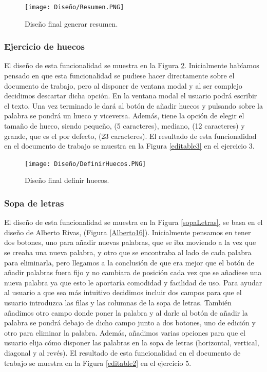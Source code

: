 \begin{figure}[ht!]
  \centering
  \texttt{[image: Diseño/Resumen.PNG]}
  \caption{Diseño final generar resumen.}
  \label{resuemn}
\end{figure}

\subsubsection{Ejercicio de huecos}
El diseño de esta funcionalidad se muestra en la Figura \ref{definir_hueco}. Inicialmente habíamos pensado en que esta funcionalidad se pudiese hacer directamente sobre el documento de trabajo, pero al disponer de ventana modal y al ser complejo decidimos descartar dicha opción. En la ventana modal el usuario podrá escribir el texto. Una vez terminado le dará al botón de añadir huecos y pulsando sobre la palabra se pondrá un hueco y viceversa. Además, tiene la opción de elegir el tamaño de hueco, siendo pequeño, (5 caracteres), mediano, (12 caracteres) y grande, que es el por defecto, (23 caracteres). El resultado de esta funcionalidad en el documento de trabajo se muestra en la Figura \ref{editable3} en el ejercicio 3.

\begin{figure}[ht!]
  \centering
  \texttt{[image: Diseño/DefinirHuecos.PNG]}
  \caption{Diseño final definir huecos.}
  \label{definir_hueco}
\end{figure}

\subsubsection{Sopa de letras}
El diseño de esta funcionalidad se muestra en la Figura \ref{sopaLetras}, se basa en el diseño de Alberto Rivas, (Figura \ref{Alberto16}). Inicialmente pensamos en tener dos botones, uno para añadir nuevas palabras, que se iba moviendo a la vez que se creaba una nueva palabra, y otro que se encontraba al lado de cada palabra para eliminarla, pero llegamos a la conclusión
de que era mejor que el botón de añadir palabras fuera fijo y no cambiara de posición cada vez que se añadiese una nueva palabra ya que esto le aportaría comodidad y facilidad de uso. Para ayudar al usuario a que sea más intuitivo decidimos incluir dos campos para que el usuario introduzca las filas y las columnas de la sopa de letras. También añadimos otro campo donde poner la palabra y al darle al botón de añadir la palabra se pondrá debajo de dicho campo junto a dos botones, uno de edición y otro para eliminar la palabra. Además, añadimos varias opciones para que el usuario elija cómo disponer las palabras en la sopa de letras (horizontal, vertical, diagonal y al revés). El resultado de esta funcionalidad en el documento de trabajo se muestra en la Figura \ref{editable2} en el ejercicio 5.

